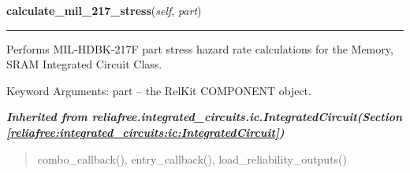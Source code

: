     \vspace{0.5ex}

\hspace{.8\funcindent}\begin{boxedminipage}{\funcwidth}

    \raggedright \textbf{calculate\_mil\_217\_stress}(\textit{self}, \textit{part})

    \vspace{-1.5ex}

    \rule{\textwidth}{0.5\fboxrule}
\setlength{\parskip}{2ex}
    Performs MIL-HDBK-217F part stress hazard rate calculations for the 
    Memory, SRAM Integrated Circuit Class.

    Keyword Arguments: part -- the RelKit COMPONENT object.

\setlength{\parskip}{1ex}
    \end{boxedminipage}


\large{\textbf{\textit{Inherited from reliafree.integrated\_circuits.ic.IntegratedCircuit\textit{(Section \ref{reliafree:integrated_circuits:ic:IntegratedCircuit})}}}}

\begin{quote}
combo\_callback(), entry\_callback(), load\_reliability\_outputs()
\end{quote}
